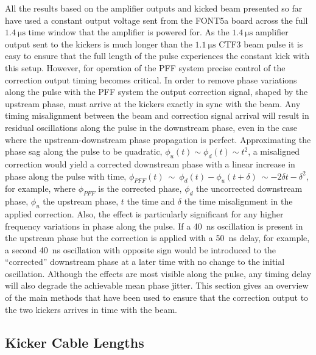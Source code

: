All the results based on the amplifier outputs and kicked beam presented so far have used a constant output voltage sent from the FONT5a board across the full \(1.4~\mathrm{\mu s}\) time window that the amplifier is powered for. As the \(1.4~\mathrm{\mu s}\) amplifier output sent to the kickers is much longer than the \(1.1~\mathrm{\mu s}\) CTF3 beam pulse it is easy to ensure that the full length of the pulse experiences the constant kick with this setup. However, for operation of the PFF system precise control of the correction output timing becomes critical. In order to remove phase variations along the pulse with the PFF system the output correction signal, shaped by the upstream phase, must arrive at the kickers exactly in sync with the beam. Any timing misalignment between the beam and correction signal arrival will result in residual oscillations along the pulse in the downstream phase, even in the case where the upstream-downstream phase propagation is perfect. Approximating the phase sag along the pulse to be quadratic, \(\phi_{u}(t) \sim \phi_{d}(t) \sim t^2\), a misaligned correction would yield a corrected downstream phase with a linear increase in phase along the pulse with time, \(\phi_{PFF}(t)~\sim~\phi_d(t)-\phi_u(t+\delta)~\sim -2\delta t - \delta^2\), for example, where \(\phi_{PFF}\) is the corrected phase, \(\phi_{d}\) the uncorrected downstream phase, \(\phi_{u}\) the upstream phase, \(t\) the time and \(\delta\) the time misalignment in the applied correction. Also, the effect is particularly significant for any higher frequency variations in phase along the pulse. If a 40~ns oscillation is present in the upstream phase but the correction is applied with a 50~ns delay, for example, a second 40~ns oscillation with opposite sign would be introduced to the ``corrected'' downstream phase at a later time with no change to the initial oscillation. Although the effects are most visible along the pulse, any timing delay will also degrade the achievable mean phase jitter. This section gives an overview of the main methods that have been used to ensure that the correction output to the two kickers arrives in time with the beam. 

\subsection{Kicker Cable Lengths}
\label{ss:kickerCables}

